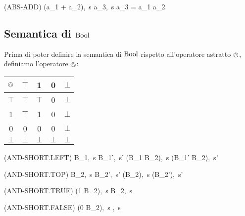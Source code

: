 \begin{center}
	(ABS-ADD)
	\prooftree
		\justifies
		\langle (a_1 + a_2),\ s \rangle \rightarrow \langle a_3,\ s \rangle 
		\using a_3 = a_1 \absadd a_2
	\endprooftree
\end{center}

\subsection{Semantica di $\mathrm{Bool}$}

Prima di poter definire la semantica di $\mathrm{Bool}$ rispetto all'operatore astratto $\mathrel{\owedge}$, definiamo l'operatore $\mathrel{\owedge}$:

\begin{center}
	\begin{tabular}{| c | c | c | c | c |}
		\hline
		$\mathrel{\owedge}$ & $\top$ & 1 & 0 & $\bot$ \\
		\hline
		$\top$ & $\top$ & $\top$ & 0 & $\bot$ \\
		\hline
		1 & $\top$ & 1 & 0 & $\bot$ \\
		\hline
		0 & 0 & 0 & 0 & $\bot$ \\
		\hline
		$\bot$ & $\bot$ & $\bot$ & $\bot$ & $\bot$ \\
		\hline
	\end{tabular}
\end{center} 

\begin{center}
	(AND-SHORT.LEFT)
	\prooftree
		\langle B_1,\ s \rangle \rightarrow \langle B_1',\ s' \rangle
		\justifies
		\langle (B_1 \wedge B_2),\ s \rangle \rightarrow \langle (B_1' \wedge B_2),\ s' \rangle
	\endprooftree
\end{center}

\begin{center}
	(AND-SHORT.TOP)
	\prooftree
		\langle B_2,\ s \rangle \rightarrow \langle B_2',\ s' \rangle
		\justifies
		\langle (\top \wedge B_2),\ s \rangle \rightarrow \langle (\top \wedge B_2'),\ s' \rangle
	\endprooftree
\end{center}

\begin{center}
	(AND-SHORT.TRUE)
	\prooftree
		\justifies
		\langle (1 \wedge B_2),\ s \rangle \rightarrow \langle B_2,\ s \rangle
	\endprooftree
\end{center}

\begin{center}
	(AND-SHORT.FALSE)
	\prooftree
		\justifies
		\langle (0 \wedge B_2),\ s \rangle \rightarrow {},\ s \rangle
	\endprooftree
\end{center}

